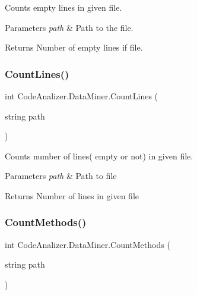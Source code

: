 Counts empty lines in given file. 


\begin{DoxyParams}{Parameters}
{\em path} & Path to the file.\\
\hline
\end{DoxyParams}
\begin{DoxyReturn}{Returns}
Number of empty lines if file.
\end{DoxyReturn}
\mbox{\label{class_code_analizer_1_1_data_miner_a706750ce1506885051c9879b88615bc5}} 
\subsubsection{\texorpdfstring{Count\+Lines()}{CountLines()}}
{\footnotesize\ttfamily int Code\+Analizer.\+Data\+Miner.\+Count\+Lines (\begin{DoxyParamCaption}\item[{string}]{path }\end{DoxyParamCaption})}



Counts number of lines( empty or not) in given file. 


\begin{DoxyParams}{Parameters}
{\em path} & Path to file\\
\hline
\end{DoxyParams}
\begin{DoxyReturn}{Returns}
Number of lines in given file
\end{DoxyReturn}
\mbox{\label{class_code_analizer_1_1_data_miner_aa125dd16b9cd80855b93a00f3b0bae13}} 
\subsubsection{\texorpdfstring{Count\+Methods()}{CountMethods()}}
{\footnotesize\ttfamily int Code\+Analizer.\+Data\+Miner.\+Count\+Methods (\begin{DoxyParamCaption}\item[{string}]{path }\end{DoxyParamCaption})}



